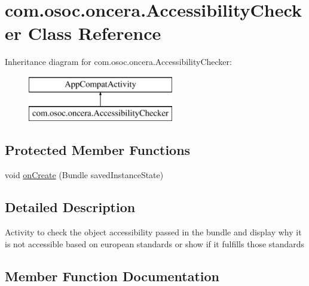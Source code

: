 \hypertarget{classcom_1_1osoc_1_1oncera_1_1_accessibility_checker}{}\section{com.\+osoc.\+oncera.\+Accessibility\+Checker Class Reference}
\label{classcom_1_1osoc_1_1oncera_1_1_accessibility_checker}
Inheritance diagram for com.\+osoc.\+oncera.\+Accessibility\+Checker\+:\begin{figure}[H]
\begin{center}
\leavevmode
\includegraphics[height=2.000000cm]{classcom_1_1osoc_1_1oncera_1_1_accessibility_checker}
\end{center}
\end{figure}
\subsection*{Protected Member Functions}
\begin{DoxyCompactItemize}
\item 
void \mbox{\hyperlink{classcom_1_1osoc_1_1oncera_1_1_accessibility_checker_a2f9cfaaf25be4a9b0853911c4a924552}{on\+Create}} (Bundle saved\+Instance\+State)
\end{DoxyCompactItemize}


\subsection{Detailed Description}
Activity to check the object accessibility passed in the bundle and display why it is not accessible based on european standards or show if it fulfills those standards 

\subsection{Member Function Documentation}
\mbox{\label{classcom_1_1osoc_1_1oncera_1_1_accessibility_checker_a2f9cfaaf25be4a9b0853911c4a924552}} 
